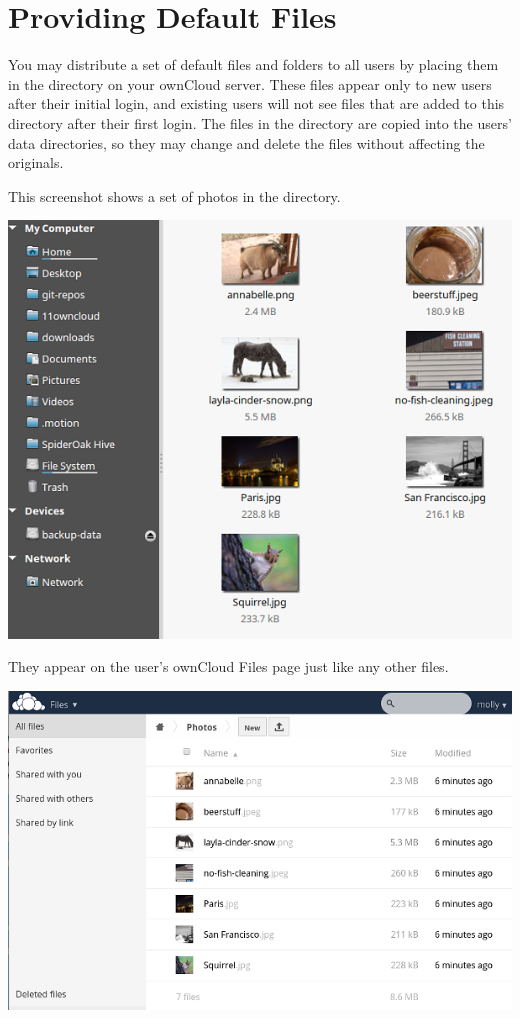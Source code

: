 \documentclass[letterpaper,10pt,english]{sphinxmanual}
\begin{document}
\section{Providing Default Files}
\label{configuration_files/default_files_configuration::doc}\label{configuration_files/default_files_configuration:providing-default-files}
You may distribute a set of default files and folders to all users by placing
them in the  directory on your ownCloud server.
These files appear only to new users after their initial login, and existing
users will not see files that are added to this directory after their first
login. The files in the  directory are copied into the users'
data directories, so they may change and delete the files without affecting the
originals.

This screenshot shows a set of photos in the  directory.

\includegraphics{skeleton-files.png}

They appear on the user's ownCloud Files page just like any other files.

\includegraphics{skeleton-files1.png}
\end{document}
